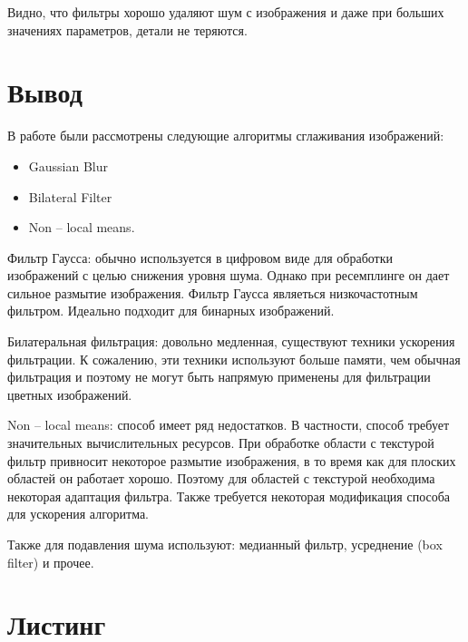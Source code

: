 \documentclass[14pt,a4paper,report]{report}
\begin{document}
Видно, что фильтры хорошо удаляют шум с изображения и даже при больших значениях параметров, детали не теряются.


\section{Вывод}

В работе были рассмотрены следующие алгоритмы сглаживания изображений:
\begin{itemize}
\item Gaussian Blur
\item Bilateral Filter
\item Non – local means.
\end{itemize}

Фильтр Гаусса:  обычно используется в цифровом виде для обработки изображений с целью снижения уровня шума. Однако при ресемплинге он дает сильное размытие изображения. Фильтр Гаусса являеться низкочастотным фильтром. Идеально подходит для бинарных изображений.

Билатеральная фильтрация: довольно медленная, существуют техники ускорения фильтрации. К сожалению, эти техники используют больше памяти, чем обычная фильтрация и поэтому не могут быть напрямую применены для фильтрации цветных изображений.

Non – local means: способ имеет ряд недостатков. В частности, способ требует значительных вычислительных ресурсов. При обработке области с текстурой фильтр привносит некоторое размытие изображения, в то время как для плоских областей он работает хорошо. Поэтому для областей с текстурой необходима некоторая адаптация фильтра. Также требуется некоторая модификация способа для ускорения алгоритма.

Также для подавления шума используют: медианный фильтр, усреднение (box filter) и прочее.


\clearpage
\section{Листинг}

\end{document}
